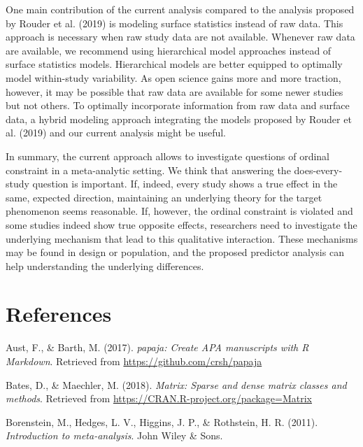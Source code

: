 \documentclass[english,,man]{apa6}
\begin{document}
One main contribution of the current analysis compared to the analysis proposed by Rouder et al. (2019) is modeling surface statistics instead of raw data. This approach is necessary when raw study data are not available. Whenever raw data are available, we recommend using hierarchical model approaches instead of surface statistics models. Hierarchical models are better equipped to optimally model within-study variability. As open science gains more and more traction, however, it may be possible that raw data are available for some newer studies but not others. To optimally incorporate information from raw data and surface data, a hybrid modeling approach integrating the models proposed by Rouder et al. (2019) and our current analysis might be useful.

In summary, the current approach allows to investigate questions of ordinal constraint in a meta-analytic setting. We think that answering the does-every-study question is important. If, indeed, every study shows a true effect in the same, expected direction, maintaining an underlying theory for the target phenomenon seems reasonable. If, however, the ordinal constraint is violated and some studies indeed show true opposite effects, researchers need to investigate the underlying mechanism that lead to this qualitative interaction. These mechanisms may be found in design or population, and the proposed predictor analysis can help understanding the underlying differences.

\newpage

\hypertarget{references}{%
\section{References}\label{references}}

\begingroup
\setlength{\parindent}{-0.5in}
\setlength{\leftskip}{0.5in}

\hypertarget{refs}{}
\leavevmode\hypertarget{ref-R-papaja}{}%
Aust, F., \& Barth, M. (2017). \emph{papaja: Create APA manuscripts with R Markdown}. Retrieved from \url{https://github.com/crsh/papaja}

\leavevmode\hypertarget{ref-R-Matrix}{}%
Bates, D., \& Maechler, M. (2018). \emph{Matrix: Sparse and dense matrix classes and methods}. Retrieved from \url{https://CRAN.R-project.org/package=Matrix}

\leavevmode\hypertarget{ref-Borenstein:etal:2011}{}%
Borenstein, M., Hedges, L. V., Higgins, J. P., \& Rothstein, H. R. (2011). \emph{Introduction to meta-analysis}. John Wiley \& Sons.
\end{document}

